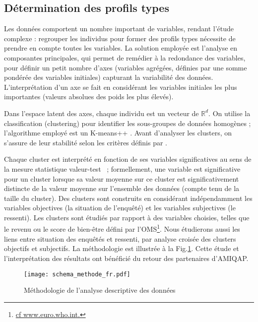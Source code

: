 \documentclass[11pt,fleqn,openany,frenchb]{book} %
\def\NOTE#1{\footnote{MS : #1}}
\begin{document}
\subsection{Détermination des profils types}
Les données %
comportent un nombre important de variables,
rendant l'étude complexe : regrouper les individus pour former des
profils types nécessite de prendre en compte toutes les variables. La
solution employée est l'analyse en composantes principales, qui permet
de remédier à la redondance des variables, pour définir un petit
nombre d'axes (variables agrégées, définies par une somme pondérée des
variables initiales) capturant la variabilité des
données. L'interprétation d'un axe se fait en considérant les
variables initiales les plus importantes (valeurs absolues des poids
les plus élevés). \par

Dans l'espace latent des axes, chaque individu est un vecteur de
$\mathbb{R}^d$. On utilise la classification (clustering) pour
identifier les sous-groupes de données homogènes ; l'algorithme
employé est un K-means++ \cite{arthur2007k}. Avant d'analyser les
clusters, on s'assure de leur stabilité selon les critères définis par
\cite{meilua2006uniqueness}. \par

Chaque cluster est interprété en fonction de ses variables significatives au sens
de la mesure statistique valeur-test \cite{lebart2006statistique}~;
formellement, une variable est significative pour un cluster lorsque
sa valeur moyenne sur ce cluster est significativement distincte de la
valeur moyenne sur l'ensemble des données (compte tenu de la taille du
cluster). Des clusters sont construits en considérant indépendamment les variables objectives (la situation de l'enquêté) et les variables subjectives (le ressenti). Les clusters sont 
étudiés par rapport à des variables choisies, telles que le revenu ou le score de
bien-être défini par
l'OMS\footnote{\href{http://www.euro.who.int/fr/publications/abstracts/measurement-of-and-target-setting-for-well-being-an-initiative-by-the-who-regional-office-for-europe}{cf
    www.euro.who.int.}}. Nous étudierons aussi les liens entre situation des enquêtés 
    et ressenti, par analyse croisée des clusters objectifs et subjectifs. La méthodologie est illustrée à la Fig.\ref{fig:metho}.
    Cette étude et l'interprétation des résultats ont bénéficié du retour des partenaires d'AMIQAP.
\par

\begin{figure}[!h]
  \centering
  \texttt{[image: schema\_methode\_fr.pdf]}
  \caption{Méthodologie de l'analyse descriptive des données}
  \label{fig:metho}
\end{figure}
\end{document}
